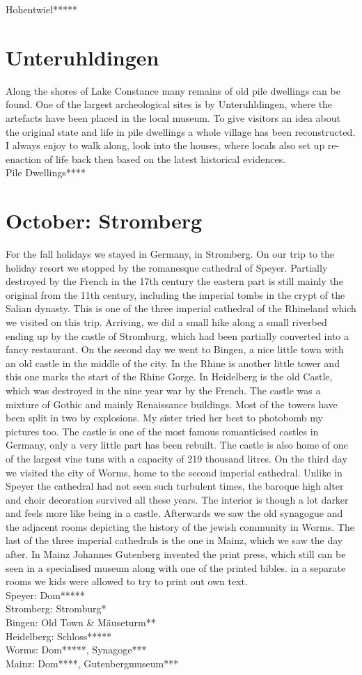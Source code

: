 Hohentwiel*****

\section{Unteruhldingen}
\label{1996:Unteruhldingen}

Along the shores of Lake Constance many remains of old pile dwellings can be found. One of the largest archeological sites is by Unteruhldingen, where the artefacts have been placed in the local museum. To give visitors an idea about the original state and life in pile dwellings a whole village has been reconstructed. I always enjoy to walk along, look into the houses, where locals also set up re-enaction of life back then based on the latest historical evidences.\\

Pile Dwellings****


\section{October: Stromberg}
\label{1996:Stromberg}

For the fall holidays we stayed in Germany, in Stromberg. On our trip to the holiday resort we stopped by the romanesque cathedral of Speyer. Partially destroyed by the French in the 17th century the eastern part is still mainly the original from the 11th century, including the imperial tombs in the crypt of the Salian dynasty. This is one of the three imperial cathedral of the Rhineland which we visited on this trip. Arriving, we did a small hike along a small riverbed ending up by the castle of Stromburg, which had been partially converted into a fancy restaurant. On the second day we went to Bingen, a nice little town with an old castle in the middle of the city. In the Rhine is another little tower and this one marks the start of the Rhine Gorge. In Heidelberg is the old Castle, which was destroyed in the nine year war by the French. The castle was a mixture of Gothic and mainly Renaissance buildings. Most of the towers have been split in two by explosions. My sister tried her best to photobomb my pictures too. The castle is one of the most famous romanticised castles in Germany, only a very little part has been rebuilt. The castle is also home of one of the largest vine tuns with a capacity of 219 thousand litres. On the third day we visited the city of Worms, home to the second imperial cathedral. Unlike in Speyer the cathedral had not seen such turbulent times, the baroque high alter and choir decoration survived all these years. The interior is though a lot darker and feels more like being in a castle. Afterwards we saw the old synagogue and the adjacent rooms depicting the history of the jewish community in Worms. The last of the three imperial cathedrals is the one in Mainz, which we saw the day after. In Mainz Johannes Gutenberg invented the print press, which still can be seen in a specialised museum along with one of the printed bibles. in a separate rooms we kids were allowed to try to print out own text.\\ 

Speyer: Dom*****\\
Stromberg: Stromburg*\\
Bingen: Old Town \& M\"auseturm**\\
Heidelberg: Schloss*****\\
Worms: Dom*****, Synagoge***\\
Mainz: Dom****, Gutenbergmuseum***